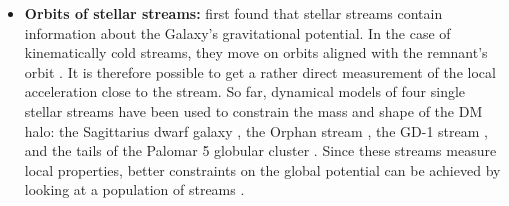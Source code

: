 \begin{itemize}
    \iffalse\item Kinematics of nearby stars: \cite{Kuijken...LocalDMdens...1989, Bovy...LocalDMdens...2012} \fi
    \item \textbf{Orbits of stellar streams:} \citet{Johnston...MWstreams...1999} first found that stellar streams contain information about the Galaxy's gravitational potential. In the case of kinematically cold streams, they move on orbits aligned with the remnant's orbit \citep{Eyre...streamstheo...2011}. It is therefore possible to get a rather direct measurement of the local acceleration close to the stream. So far, dynamical models of four single stellar streams have been used to constrain the mass and shape of the \ac{DM} halo: the Sagittarius dwarf galaxy \citep{Law...sagstream...2010, Gibbons...sagstream...2014, Dierickx...sagstream..2017}, the Orphan stream \citep{Newberg...orphanstream..2010}, the GD-1 stream \citep{Koposov...GD1stream...2010, Bowden...GD1stream...2015, Malhan...GD1stream...2018}, and the tails of the Palomar 5 globular cluster \citep{Kupper...pal5stream...2015}. Since these streams measure local properties, better constraints on the global potential can be achieved by looking at a population of streams \citep{Bonaca...streamsinfo...2018}.
    

\end{itemize}
